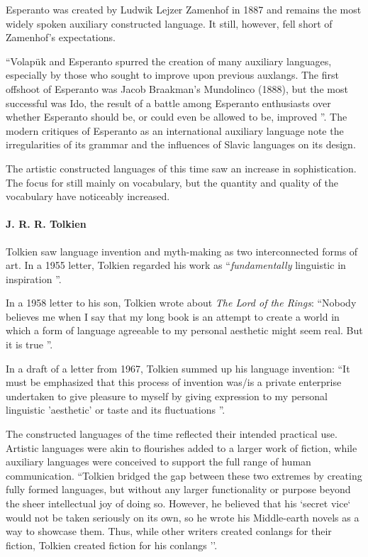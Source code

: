\documentclass[14pt, a4paper]{extreport}
\begin{document}
Esperanto was created by Ludwik Lejzer Zamenhof in 1887 and remains the most widely spoken auxiliary constructed language. It still, however, fell short of Zamenhof's expectations.

``Volapük and Esperanto spurred the creation of many auxiliary languages, especially by those who sought to improve upon previous auxlangs. The first offshoot of Esperanto was Jacob Braakman's Mundolinco (1888), but the most successful was Ido, the result of a battle among Esperanto enthusiasts over whether Esperanto should be, or could even be allowed to be, improved \parencite{sanders}''. The modern critiques of Esperanto as an international auxiliary language note the irregularities of its grammar and the influences of Slavic languages on its design.

The artistic constructed languages of this time saw an increase in sophistication. The focus for still mainly on vocabulary, but the quantity and quality of the vocabulary have noticeably increased.
        \paragraph{J. R. R. Tolkien}
Tolkien saw language invention and myth-making as two interconnected forms of art. In a 1955 letter, Tolkien regarded his work as ``\textit{fundamentally} linguistic in inspiration \parencite[233]{letters}''.

In a 1958 letter to his son, Tolkien wrote about \textit{The Lord of the Rings}: ``Nobody believes me when I say that my long book is an attempt to create a world in which a form of language agreeable to my personal aesthetic might seem real. But it is true \parencite[285]{letters}''.

In a draft of a letter from 1967, Tolkien summed up his language invention: ``It must be emphasized that this process of invention was/is a private enterprise undertaken to give pleasure to myself by giving expression to my personal linguistic 'aesthetic' or taste and its fluctuations \parencite[411]{letters}''.

The constructed languages of the time reflected their intended practical use. Artistic languages were akin to flourishes added to a larger work of fiction, while auxiliary languages were conceived to support the full range of human communication. ``Tolkien bridged the gap between these two extremes by creating fully formed languages, but without any larger functionality or purpose beyond the sheer intellectual joy of doing so. However, he believed that his `secret vice` would not be taken seriously on its own, so he wrote his Middle-earth novels as a way to showcase them. Thus, while other writers created conlangs for their fiction, Tolkien created fiction for his conlangs \parencite{sanders}''.
\end{document}
